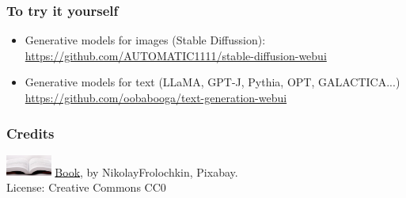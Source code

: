 \documentclass[17pt,aspectratio=169,hyperref={pdfusetitle,colorlinks,allcolors=olive}]{beamer}
\begin{document}
\begin{frame}[fragile]
  \frametitle{To try it yourself}


  {\small
    \begin{itemize}
    \item Generative models for images (Stable Diffussion): \\
      {\scriptsize \url{https://github.com/AUTOMATIC1111/stable-diffusion-webui}}
    \item Generative models for text (LLaMA, GPT-J, Pythia, OPT, GALACTICA...) \\
      {\scriptsize \url{https://github.com/oobabooga/text-generation-webui}}
    \end{itemize}
  }  
\end{frame}

\begin{frame}[fragile]
  \frametitle{Credits}

  \includegraphics[width=1.5cm]{figs/bookpages}
  {\small \href{https://pixabay.com/en/book-reading-library-literature-1261800/}{Book}, by NikolayFrolochkin, Pixabay. \\ License: Creative Commons CC0\\}

\end{frame}




\end{document}
